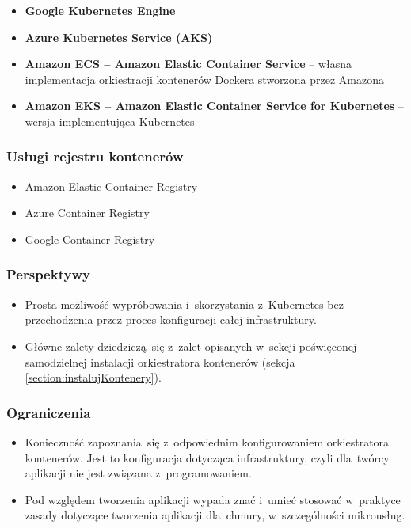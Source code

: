 \documentclass[12pt,a4paper,twoside,titlepage,openright]{book}
\begin{document}
\begin{itemize}
\item \textbf{Google Kubernetes Engine}
\item \textbf{Azure Kubernetes Service (AKS)}
\item \textbf{Amazon ECS -- Amazon Elastic Container Service} -- własna implementacja orkiestracji kontenerów Dockera stworzona przez Amazona
\item \textbf{Amazon EKS -- Amazon Elastic Container Service for Kubernetes} -- wersja implementująca Kubernetes
\end{itemize}

\subsubsection{Usługi rejestru kontenerów}

\begin{itemize}
\item Amazon Elastic Container Registry
\item Azure Container Registry
\item Google Container Registry
\end{itemize}

\subsubsection{Perspektywy}

\begin{itemize}
\item Prosta możliwość wypróbowania i~skorzystania z~Kubernetes bez przechodzenia przez proces konfiguracji całej infrastruktury.
\item Główne zalety dziedziczą~się z~zalet opisanych w~sekcji poświęconej samodzielnej instalacji orkiestratora kontenerów (sekcja \ref{section:instalujKontenery}).
\end{itemize}

\subsubsection{Ograniczenia}
\begin{itemize}
\item Konieczność zapoznania~się z~odpowiednim konfigurowaniem orkiestratora kontenerów. Jest to konfiguracja dotycząca infrastruktury, czyli dla~twórcy aplikacji nie jest związana z~programowaniem.
\item Pod względem tworzenia aplikacji wypada znać i~umieć stosować w~praktyce zasady dotyczące tworzenia aplikacji dla~chmury, w~szczególności mikrousług.
\end{itemize}
\end{document}
